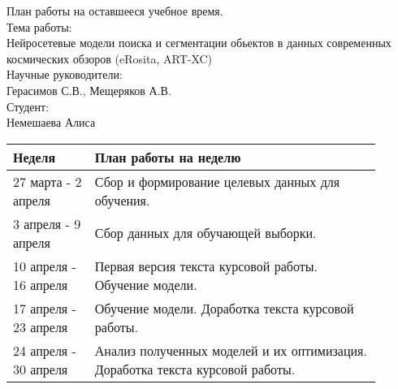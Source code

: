 \documentclass{article}
\begin{document}
План работы на оставшееся учебное время.\\
Тема работы:\\
Нейросетевые модели поиска и сегментации обьектов в данных современных космических обзоров (eRosita, ART-XC)\\
Научные руководители:\\
Герасимов С.В., Мещеряков А.В.\\
Студент:\\
Немешаева Алиса\\
    \begin{table}[h!]
        \begin{tabular}{|p{0.2\linewidth}|p{0.7\linewidth}|}
            \hline
            \textbf{Неделя} & \textbf{План работы на неделю}\\
            \hline
            27 марта - 2 апреля & Сбор и формирование целевых данных для обучения.\\
            3 апреля - 9 апреля & Сбор данных для обучающей выборки.\\
            10 апреля - 16 апреля & Первая версия текста курсовой работы. Обучение модели. \\
            17 апреля - 23 апреля & Обучение модели. Доработка текста курсовой работы. \\
            24 апреля - 30 апреля & Анализ полученных моделей и их оптимизация. Доработка текста курсовой работы. \\
            \hline
        \end{tabular}
    \end{table}
\end{document}
